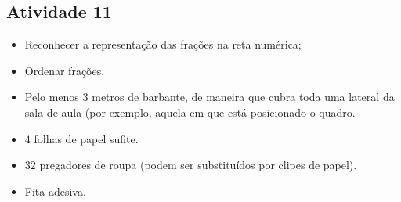\begin{multicols}{2}
\subsection{Atividade 11}

\begin{itemize} %
  \item     Reconhecer a representação das frações na reta numérica;
  \item     Ordenar frações. 
\end{itemize} %

\begin{itemize} %
  \item     Pelo menos     $3$     metros de barbante, de maneira que cubra toda uma lateral da sala de aula (por exemplo, aquela em que está posicionado o quadro. 
  \item         $4$     folhas de papel sufite. 
  \item         $32$     pregadores de roupa (podem ser substituídos por clipes de papel).
  \item     Fita adesiva.
\end{itemize} %


\end{multicols}
